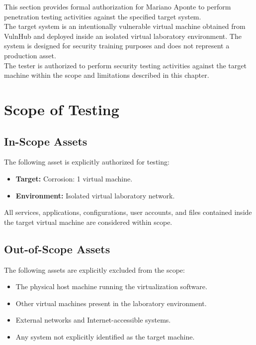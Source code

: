 This section provides formal authorization for Mariano Aponte to perform
penetration testing activities against the specified target system.
\\

The target system is an intentionally vulnerable virtual machine obtained from
VulnHub and deployed inside an isolated virtual laboratory environment. The
system is designed for security training purposes and does not represent a
production asset.
\\

The tester is authorized to perform security testing activities against the
target machine within the scope and limitations described in this chapter.


\section{Scope of Testing}

\subsection{In-Scope Assets}

The following asset is explicitly authorized for testing:

\begin{itemize}
    \item \textbf{Target:} Corrosion: 1 virtual machine.
    \item \textbf{Environment:} Isolated virtual laboratory network.
\end{itemize}

All services, applications, configurations, user accounts, and files contained
inside the target virtual machine are considered within scope.


\subsection{Out-of-Scope Assets}

The following assets are explicitly excluded from the scope:

\begin{itemize}
    \item The physical host machine running the virtualization software.
    \item Other virtual machines present in the laboratory environment.
    \item External networks and Internet-accessible systems.
    \item Any system not explicitly identified as the target machine.
\end{itemize}

